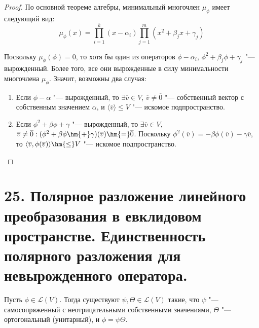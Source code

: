\begin{proof}
    По основной теореме алгебры, минимальный многочлен $\mu_\phi$ имеет следующий вид:
    \[\mu_\phi(x) = \prod_{i = 1}^k(x - \alpha_i)\prod_{j = 1}^m(x^2 + \beta_jx + \gamma_j)\]
    
    Поскольку $\mu_\phi(\phi) = 0$, то хотя бы один из операторов $\phi - \alpha_i$, $\phi^2 + \beta_j\phi + \gamma_j$ "--- вырожденный. Более того, все они вырожденные в силу минимальности многочлена $\mu_\phi$. Значит, возможны два случая:
    \begin{enumerate}
        \item Если $\phi - \alpha$ "--- вырожденный, то $\exists \overline{v} \in V$, $\overline{v} \ne \overline{0}$ "--- собственный вектор с собственным значением $\alpha$, и $\langle\overline{v}\rangle \le V$ "--- искомое подпространство.
        \item Если $\phi^2 + \beta\phi + \gamma$ "--- вырожденный, то $\exists \overline{v} \in V$, $\overline{v} \ne \overline{0}: (\phi^2 + \beta\phi \hm{+} \gamma)(\overline{v}) \hm{=} \overline{0}$. Поскольку $\phi^2(\overline{v}) = -\beta\phi(\overline{v}) - \gamma\overline{v}$, то $\langle\overline{v}, \phi(\overline{v})\rangle \hm{\le} V$ "--- искомое подпространство.\qedhere
    \end{enumerate}
\end{proof}

\section{25. Полярное разложение линейного преобразования в евклидовом пространстве. Единственность полярного разложения для невырожденного оператора.}

\begin{theorem}
    Пусть $\phi \in \mathcal{L}(V)$. Тогда существуют $\psi, \Theta \in \mathcal{L}(V)$ такие, что $\psi$ "--- самосопряженный с неотрицательными собственными значениями, $\Theta$ "--- ортогональный (унитарный), и $\phi = \psi\Theta$.
\end{theorem}

